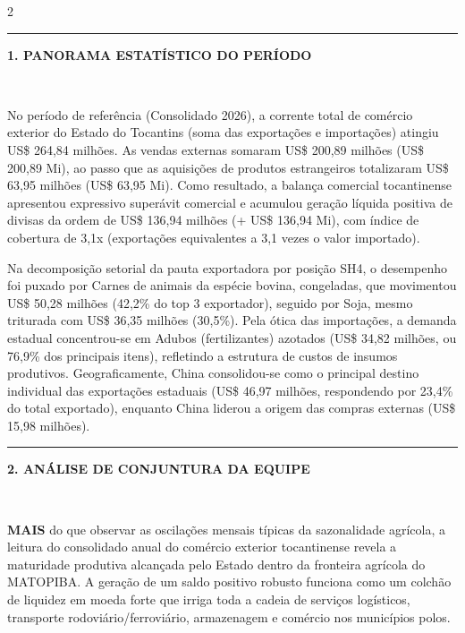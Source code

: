 \documentclass[10pt,a4paper]{article}
\newcommand{\secaoperiodico}[1]{%
  \vspace{4pt}%
  \noindent\colorbox{corfundo}{%
    \parbox{\dimexpr\columnwidth-2\fboxsep\relax}{%
      \vspace{3pt}%
      \textcolor{douradoto}{\rule{4pt}{9pt}}\hspace{6pt}%
      \textcolor{corprimaria}{\textbf{\small \MakeUppercase{#1}}}%
      \vspace{2pt}%
    }%
  }\\[-2pt]%
  \noindent{\color{corprimaria}\rule{\columnwidth}{1pt}}%
  \vspace{3pt}\par%
}
\begin{document}
\begin{multicols}{2}
\secaoperiodico{1. Panorama Estatístico do Período}

No período de referência (Consolidado 2026), a corrente total de comércio exterior do Estado do Tocantins (soma das exportações e importações) atingiu US\$ 264,84 milhões. As vendas externas somaram US\$ 200,89 milhões (US\$ 200,89 Mi), ao passo que as aquisições de produtos estrangeiros totalizaram US\$ 63,95 milhões (US\$ 63,95 Mi). Como resultado, a balança comercial tocantinense apresentou expressivo superávit comercial e acumulou geração líquida positiva de divisas da ordem de US\$ 136,94 milhões (+ US\$ 136,94 Mi), com índice de cobertura de 3,1x (exportações equivalentes a 3,1 vezes o valor importado).

\vspace{4pt}

Na decomposição setorial da pauta exportadora por posição SH4, o desempenho foi puxado por Carnes de animais da espécie bovina, congeladas, que movimentou US\$ 50,28 milhões (42,2\% do top 3 exportador), seguido por Soja, mesmo triturada com US\$ 36,35 milhões (30,5\%). Pela ótica das importações, a demanda estadual concentrou-se em Adubos (fertilizantes) azotados (US\$ 34,82 milhões, ou 76,9\% dos principais itens), refletindo a estrutura de custos de insumos produtivos. Geograficamente, China consolidou-se como o principal destino individual das exportações estaduais (US\$ 46,97 milhões, respondendo por 23,4\% do total exportado), enquanto China liderou a origem das compras externas (US\$ 15,98 milhões).

\secaoperiodico{2. Análise de Conjuntura da Equipe}

\lettrine[lines=2, lhang=0.05, nindent=2pt]{\textcolor{corprimaria}{\textbf{M}}}{\textbf{AIS}} do que observar as oscilações mensais típicas da sazonalidade agrícola, a leitura do consolidado anual do comércio exterior tocantinense revela a maturidade produtiva alcançada pelo Estado dentro da fronteira agrícola do MATOPIBA. A geração de um saldo positivo robusto funciona como um colchão de liquidez em moeda forte que irriga toda a cadeia de serviços logísticos, transporte rodoviário/ferroviário, armazenagem e comércio nos municípios polos.

\vspace{4pt}


\end{multicols}
\end{document}
